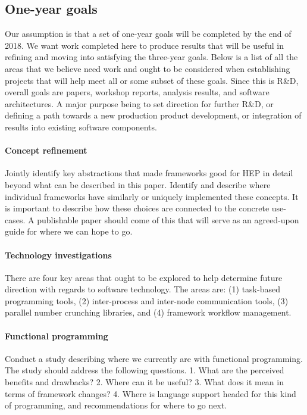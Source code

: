\documentclass[12pt,a4paper]{article}
\begin{document}
\subsection{One-year goals}
\label{sec:one-year-goals}

Our assumption is that a set of one-year goals will be completed by
the end of 2018. We want work completed here to produce results that
will be useful in refining and moving into satisfying the three-year
goals.  Below is a list of all the areas that we believe need work and
ought to be considered when establishing projects that will help meet
all or some subset of these goals. Since this is R\&D, overall goals
are papers, workshop reports, analysis results, and software
architectures. A major purpose being to set direction for further
R\&D, or defining a path towards a new production product development,
or integration of results into existing software components.

\paragraph{Concept refinement} Jointly identify key abstractions that
made frameworks good for HEP in detail beyond what can be described in
this paper. Identify and describe where individual frameworks have
similarly or uniquely implemented these concepts. It is important to 
describe how these choices are connected to the concrete use-cases. A 
publishable paper should come of this that will serve as an agreed-upon 
guide for where we can hope to go.

\paragraph{Technology investigations} There are four key areas that
ought to be explored to help determine future direction with regards
to software technology. The areas are: (1) task-based programming tools,
(2) inter-process and inter-node communication tools, (3) parallel number 
crunching libraries, and (4) framework workflow management.

\paragraph{Functional programming} Conduct a study describing where we
currently are with functional programming. The study should address
the following questions. 1. What are the perceived benefits and
drawbacks?  2. Where can it be useful? 3. What does it mean in terms
of framework changes? 4. Where is language support headed for this
kind of programming, and recommendations for where to go next.
\end{document}

